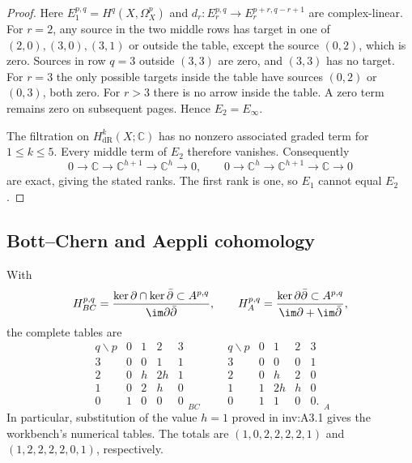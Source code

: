 \begin{proof}
Here $E_1^{p,q}=H^q(X,\Omega_X^p)$ and
$d_r:E_r^{p,q}\longrightarrow E_r^{p+r,q-r+1}$ are complex-linear.
For $r=2$, any source in the two middle rows has target in one of
$(2,0),(3,0),(3,1)$ or outside the table, except the source $(0,2)$,
which is zero.  Sources in row $q=3$ outside $(3,3)$ are zero, and
$(3,3)$ has no target.  For $r=3$ the only possible targets inside the
table have sources $(0,2)$ or $(0,3)$, both zero.  For $r>3$ there is
no arrow inside the table.  A zero term remains zero on subsequent
pages.  Hence $E_2=E_\infty$.

The filtration on $H^k_{\mathrm{dR}}(X;\mathbb C)$ has no nonzero associated
graded term for $1\le k\le5$.  Every middle term of $E_2$ therefore
vanishes.  Consequently
\[
0\longrightarrow\mathbb C\longrightarrow\mathbb C^{h+1}
\longrightarrow\mathbb C^h\longrightarrow0,
\qquad
0\longrightarrow\mathbb C^h\longrightarrow\mathbb C^{h+1}
\longrightarrow\mathbb C\longrightarrow0
\]
are exact, giving the stated ranks.  The first rank is one, so $E_1$
cannot equal $E_2$.
\end{proof}

\subsection{Bott--Chern and Aeppli cohomology}\label{sec:bc-aeppli}

\begin{theorem}\label{inv:C2.1}
With
\[
H^{p,q}_{BC}=
\frac{\ker\partial\cap\ker\bar\partial\subset A^{p,q}}
{\im\partial\bar\partial},\qquad
H^{p,q}_{A}=
\frac{\ker\partial\bar\partial\subset A^{p,q}}
{\im\partial+\im\bar\partial},
\]
the complete tables are
\begin{equation}\label{inv:eq:C-BC-A}
\begin{array}{c|rrrr}
q\backslash p&0&1&2&3\\\hline
3&0&0&1&1\\
2&0&h&2h&1\\
1&0&2&h&0\\
0&1&0&0&0
\end{array}_{BC}
\qquad
\begin{array}{c|rrrr}
q\backslash p&0&1&2&3\\\hline
3&0&0&0&1\\
2&0&h&2&0\\
1&1&2h&h&0\\
0&1&1&0&0.
\end{array}_{A}
\end{equation}
In particular, substitution of the value $h=1$ proved in inv:A3.1 gives
the workbench's numerical tables.  The totals are
$(1,0,2,2,2,2,1)$ and $(1,2,2,2,2,0,1)$, respectively.
\end{theorem}

